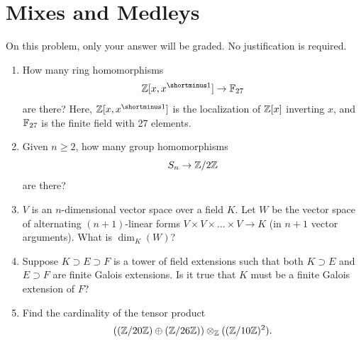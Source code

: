 \section{Mixes and Medleys}

\begin{question}[subtitle = {January 2026 Problem 1, edited},ID=Jan26_1]
On this problem, only your answer will be graded. No justification is required.
\begin{enumerate}
    \item How many ring homomorphisms
    \[\Z[x,x\inv] \to \F_{27}\]
    are there? Here, $\Z[x,x\inv]$ is the localization of $\mathbb{Z}[x]$ inverting $x$, and $\mathbb{F}_{27}$ is the finite field with 27 elements.
    \item Given $n \geq 2$, how many group homomorphisms
    \[S_n \to \mathbb{Z}/2\mathbb{Z}\]
    are there?
    \item $V$ is an $n$-dimensional vector space over a field $K$. Let $W$ be the vector space of alternating $(n+1)$-linear forms $V \times V \times \dots \times V \to K$ (in $n+1$ vector arguments). What is $\dim_K(W)$?
    \item Suppose $K \supset E \supset F$ is a tower of field extensions such that both $K \supset E$ and $E \supset F$ are finite Galois extensions. Is it true that $K$ must be a finite Galois extension of $F$? %
    \item Find the cardinality of the tensor product
    \[((\mathbb{Z}/20\mathbb{Z})\oplus (\mathbb{Z}/26\mathbb{Z})) \otimes_{\mathbb{Z}} ((\mathbb{Z}/10\mathbb{Z})^2).\]
\end{enumerate}
\end{question}
